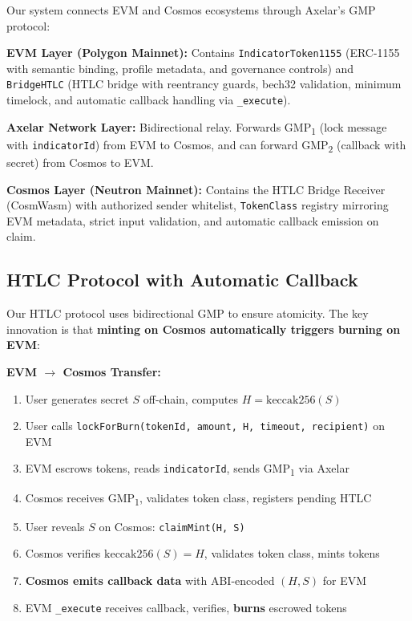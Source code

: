 \documentclass[conference,10pt]{IEEEtran}
\begin{document}
Our system connects EVM and Cosmos ecosystems through Axelar's GMP protocol:

\textbf{EVM Layer (Polygon Mainnet):} Contains \texttt{IndicatorToken1155} (ERC-1155 with semantic binding, profile metadata, and governance controls) and \texttt{BridgeHTLC} (HTLC bridge with reentrancy guards, bech32 validation, minimum timelock, and automatic callback handling via \texttt{\_execute}).

\textbf{Axelar Network Layer:} Bidirectional relay. Forwards GMP\textsubscript{1} (lock message with \texttt{indicatorId}) from EVM to Cosmos, and can forward GMP\textsubscript{2} (callback with secret) from Cosmos to EVM.

\textbf{Cosmos Layer (Neutron Mainnet):} Contains the HTLC Bridge Receiver (CosmWasm) with authorized sender whitelist, \texttt{TokenClass} registry mirroring EVM metadata, strict input validation, and automatic callback emission on claim.

\subsection{HTLC Protocol with Automatic Callback}
\label{sec:double-spend}

Our HTLC protocol uses bidirectional GMP to ensure atomicity. The key innovation is that \textbf{minting on Cosmos automatically triggers burning on EVM}:

\textbf{EVM $\rightarrow$ Cosmos Transfer:}
\begin{enumerate}
    \item User generates secret $S$ off-chain, computes $H = \text{keccak256}(S)$
    \item User calls \texttt{lockForBurn(tokenId, amount, H, timeout, recipient)} on EVM
    \item EVM escrows tokens, reads \texttt{indicatorId}, sends GMP\textsubscript{1} via Axelar
    \item Cosmos receives GMP\textsubscript{1}, validates token class, registers pending HTLC
    \item User reveals $S$ on Cosmos: \texttt{claimMint(H, S)}
    \item Cosmos verifies $\text{keccak256}(S) = H$, validates token class, mints tokens
    \item \textbf{Cosmos emits callback data} with ABI-encoded $(H, S)$ for EVM
    \item EVM \texttt{\_execute} receives callback, verifies, \textbf{burns} escrowed tokens
\end{enumerate}
\end{document}
